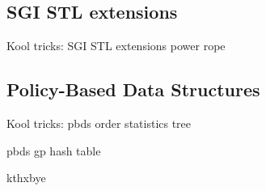 \documentclass[12pt,notes,hyperref={unicode},aspectratio=169]{beamer}
\begin{document}
\subsection{SGI STL extensions}
\begin{frame}{Kool tricks: SGI STL extensions}
  power
  rope
\end{frame}

\subsection{Policy-Based Data Structures}
\begin{frame}{Kool tricks: pbds order statistics tree}
\end{frame}

\begin{frame}{pbds gp hash table}
\end{frame}

\begin{frame}{kthxbye}
\end{frame}
\end{document}
